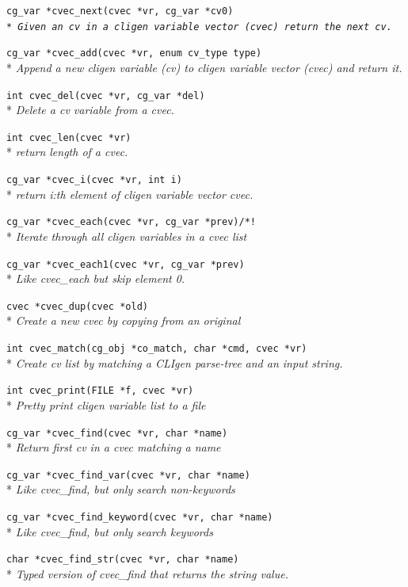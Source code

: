 \documentclass[a4paper, 10pt] {article}
\begin{document}
{\tt cg\_var *cvec\_next(cvec *vr, cg\_var *cv0)\\*
\emph{  Given an cv in a cligen variable vector (cvec) return the next cv.}

{\tt cg\_var *cvec\_add(cvec *vr, enum cv\_type type)}\\*
\emph{  Append a new cligen variable (cv) to cligen variable vector (cvec) and return it.}

{\tt int cvec\_del(cvec *vr, cg\_var *del)}\\*
\emph{  Delete a cv variable from a cvec.}

{\tt int cvec\_len(cvec *vr)}\\*
\emph{ return length of a cvec.}

{\tt cg\_var *cvec\_i(cvec *vr, int i)}\\*
\emph{ return i:th element of cligen variable vector cvec.}

{\tt cg\_var *cvec\_each(cvec *vr, cg\_var *prev)/*! }\\*
\emph{ Iterate through all cligen variables in a cvec list}

{\tt cg\_var *cvec\_each1(cvec *vr, cg\_var *prev)}\\*
\emph{ Like cvec\_each but skip element 0. }

{\tt cvec *cvec\_dup(cvec *old)}\\*
\emph{  Create a new cvec by copying from an original}

{\tt int cvec\_match(cg\_obj *co\_match, char   *cmd, cvec   *vr)}\\*
\emph{ Create cv list by matching a CLIgen parse-tree and an input string. }

{\tt int cvec\_print(FILE *f, cvec *vr)}\\*
\emph{ Pretty print cligen variable list to a file}

{\tt cg\_var *cvec\_find(cvec *vr, char *name)}\\*
\emph{ Return first cv in a cvec matching a name}

{\tt cg\_var *cvec\_find\_var(cvec *vr, char *name)}\\*
\emph{  Like cvec\_find, but only search non-keywords}

{\tt cg\_var *cvec\_find\_keyword(cvec *vr, char *name)}\\*
\emph{ Like cvec\_find, but only search keywords}

{\tt char *cvec\_find\_str(cvec *vr, char *name)}\\*
\emph{  Typed version of cvec\_find that returns the string value.}

}
\end{document}
